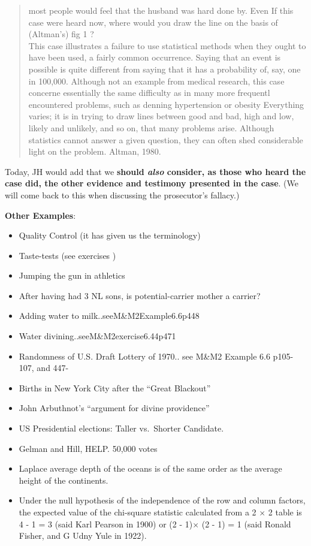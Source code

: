 \documentclass[]{book}
\providecommand{\tightlist}{%
  \setlength{\itemsep}{0pt}\setlength{\parskip}{0pt}}
\begin{document}
\begin{quote}
most people would feel that the husband was hard done by. Even If this case were heard now, where would you draw the line on the basis of (Altman's) fig 1 ?\\
This case illustrates a failure to use statistical methods when
they ought to have been used, a fairly common occurrence. Saying that an event is possible is quite different from saying that it has a probability of, say, one in 100,000. Although not an example from medical research, this case concerne essentially the same difficulty as in many more frequentl encountered problems, such as denning hypertension or obesity
Everything varies; it is in trying to draw lines between good and bad, high and low, likely and unlikely, and so on, that many problems arise. Although statistics cannot answer a given question, they can often shed considerable light on the problem. Altman, 1980.
\end{quote}

Today, JH would add that we \textbf{should \emph{also} consider, as those who heard the case did, the other evidence and testimony presented in the case}. (We will come back to this when discussing the prosecutor's fallacy.)

\textbf{Other Examples}:

\begin{itemize}
\tightlist
\item
  Quality Control (it has given us the terminology)
\item
  Taste-tests (see exercises )
\item
  Jumping the gun in athletics
\item
  After having had 3 NL sons, is potential-carrier mother a carrier?
\item
  Adding water to milk..seeM\&M2Example6.6p448
\item
  Water divining..seeM\&M2exercise6.44p471
\item
  Randomness of U.S. Draft Lottery of 1970.. see M\&M2
  Example 6.6 p105-107, and 447-
\item
  Births in New York City after the ``Great Blackout''
\item
  John Arbuthnot's ``argument for divine providence''
\item
  US Presidential elections: Taller vs.~Shorter Candidate.
\item
  Gelman and Hill, HELP. 50,000 votes
\item
  Laplace average depth of the oceans is of the same order as the average height of the continents.
\item
  Under the null hypothesis of the independence of the row and column factors, the expected value of the chi-square statistic calculated from a 2 \(\times\) 2 table is 4 - 1 = 3 (said Karl Pearson in 1900) or (2 - 1)\(\times\) (2 - 1) = 1 (said Ronald Fisher, and G Udny Yule in 1922).
\end{itemize}
\end{document}

